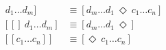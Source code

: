 \documentclass[10pt]{article}
\begin{document}
\begin{align*}[[c_1 \ldots c_n]~ d_1 \ldots d_m] &\equiv [d_m \ldots d_1 ~\Diamond~ c_1 \ldots c_n] \\
[[]~ d_1 \ldots d_m] &\equiv [d_m \ldots d_1 ~\Diamond] \\
[[c_1 \ldots c_n]] &\equiv [\Diamond~c_1 \ldots c_n] 
\end{align*}
\end{document}
